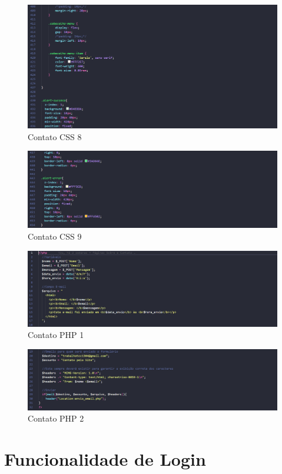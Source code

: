 \begin{figure}[!h]
	\centering
	\includegraphics[width=15cm]{Contato CSS 8}
	\caption{Contato CSS 8}
\end{figure}

\begin{figure}[!h]
	\centering
	\includegraphics[width=15cm]{Contato CSS 9}
	\caption{Contato CSS 9}
\end{figure}

\begin{figure}[!h]
	\centering
	\includegraphics[width=15cm]{Contato PHP 1}
	\caption{Contato PHP 1}
\end{figure}

\begin{figure}[!h]
	\centering
	\includegraphics[width=15cm]{Contato PHP 2}
	\caption{Contato PHP 2}
\end{figure}

\section{Funcionalidade de Login}
